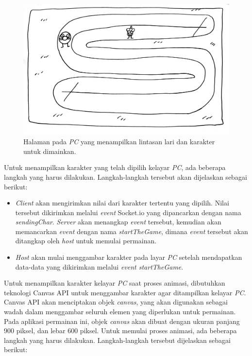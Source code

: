 \begin{enumerate}
\begin{figure}[H]
	\centering
	\includegraphics[scale=0.1]{Gambar/web5_gameplay2}
	\caption{Halaman pada \textit{PC} yang menampilkan lintasan lari dan karakter untuk dimainkan.}
	\label{fig:web5_gameplay2}
\end{figure}
	Untuk menampilkan karakter yang telah dipilih kelayar \textit{PC}, ada beberapa langkah yang harus dilakukan. Langkah-langkah tersebut akan dijelaskan sebagai berikut:
	\begin{itemize}
		\item \textit{Client} akan mengirimkan nilai dari karakter tertentu yang dipilih. Nilai tersebut dikirimkan melalui \textit{event} Socket.io yang dipancarkan dengan nama \textit{sendingChar}. \textit{Server} akan menangkap \textit{event} tersebut, kemudian akan memancarkan \textit{event} dengan nama \textit{startTheGame}, dimana \textit{event} tersebut akan ditangkap oleh \textit{host} untuk memulai permainan.
		
		\item \textit{Host} akan mulai menggambar karakter pada layar \textit{PC} setelah mendapatkan data-data yang dikirimkan melalui \textit{event startTheGame}.
		
		
	\end{itemize}
	
	Untuk menampilkan karakter kelayar \textit{PC} saat proses animasi, dibutuhkan teknologi Canvas API untuk menggambar karakter agar ditampilkan kelayar \textit{PC}. Canvas API akan menciptakan objek \textit{canvas}, yang akan digunakan sebagai wadah dalam menggambar seluruh elemen yang diperlukan untuk permainan. Pada aplikasi permainan ini, objek \textit{canvas} akan dibuat dengan ukuran panjang 900 piksel, dan lebar 600 piksel. Untuk memulai proses animasi, ada beberapa langkah yang harus dilakukan. Langkah-langkah tersebut dijelaskan sebagai berikut:
	

\end{enumerate}
